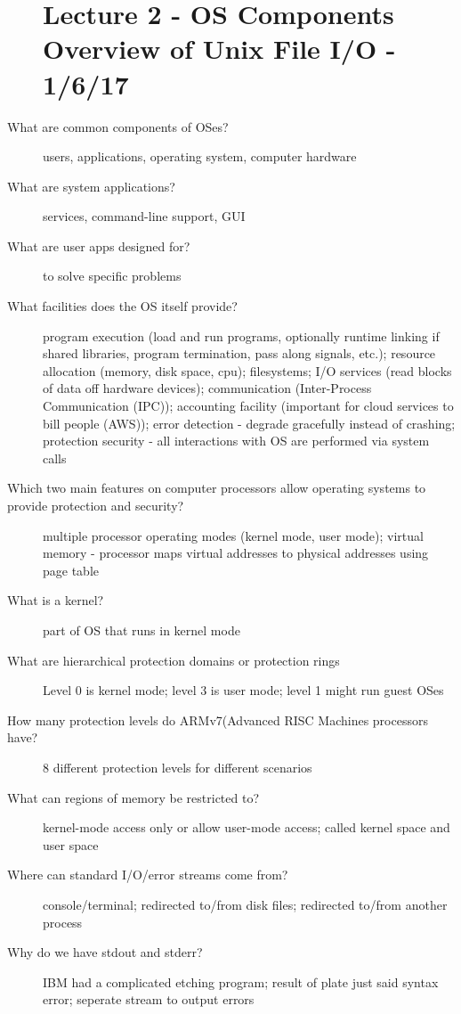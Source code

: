 \documentclass[10pt]{article}
\begin{document}
\begin{description}
\section{Lecture 2 - OS Components Overview of Unix File I/O - 1/6/17}
\item[What are common components of OSes?]
  users, applications, operating system, computer hardware
\item[What are system applications?]
  services, command-line support, GUI
\item[What are user apps designed for?]
  to solve specific problems
\item[What facilities does the OS itself provide?]
  program execution (load and run programs, optionally runtime linking if shared libraries, program termination, pass along signals, etc.);
  resource allocation (memory, disk space, cpu);
  filesystems;
  I/O services (read blocks of data off hardware devices);
  communication (Inter-Process Communication (IPC));
  accounting facility (important for cloud services to bill people (AWS));
  error detection - degrade gracefully instead of crashing;
  protection security - all interactions with OS are performed via system calls
\item[Which two main features on computer processors allow operating systems to provide protection and security?]
  multiple processor operating modes (kernel mode, user mode);
  virtual memory - processor maps virtual addresses to physical addresses using page table
\item[What is a kernel?]
  part of OS that runs in kernel mode
\item[What are hierarchical protection domains or protection rings]
  Level 0 is kernel mode; level 3 is user mode;
  level 1 might run guest OSes
\item[How many protection levels do ARMv7(Advanced RISC Machines processors have?]
  8 different protection levels for different scenarios
\item[What can regions of memory be restricted to?]
  kernel-mode access only or allow user-mode access; called kernel space and user space
\item[Where can standard I/O/error streams come from?]
  console/terminal;
  redirected to/from disk files;
  redirected to/from another process
\item[Why do we have stdout and stderr?]
  IBM had a complicated etching program;
  result of plate just said syntax error;
  seperate stream to output errors

\end{description}
\end{document}
